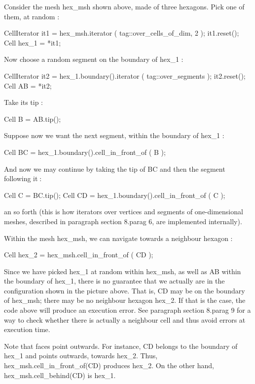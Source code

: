 Consider the mesh {\codett hex\_msh} shown above, made of three hexagons.
Pick one of them, at random :

\verbatim
   CellIterator it1 = hex_msh.iterator ( tag::over_cells_of_dim, 2 );
   it1.reset();
   Cell hex_1 = *it1;
\endverbatim

Now choose a random segment on the boundary of {\codett hex\_1} :

\verbatim
   CellIterator it2 = hex_1.boundary().iterator ( tag::over_segments );
   it2.reset();
   Cell AB = *it2;
\endverbatim

Take its tip :

\verbatim
   Cell B = AB.tip();
\endverbatim

Suppose now we want the next segment, within the boundary of {\codett hex\_1} :

\verbatim
   Cell BC = hex_1.boundary().cell_in_front_of ( B );
\endverbatim

And now we may continue by taking the tip of {\codett BC} and then the segment
following it$\;$:

\verbatim
   Cell C = BC.tip();
   Cell CD = hex_1.boundary().cell_in_front_of ( C );
\endverbatim

\noindent an so forth (this is how iterators over vertices and segments of
one-dimensional meshes, described in paragraph \numb section 8.\numb parag 6,
are implemented internally).

Within the mesh {\codett hex\_msh}, we can navigate towards a neighbour hexagon :

\verbatim
   Cell hex_2 = hex_msh.cell_in_front_of ( CD );
\endverbatim

Since we have picked {\codett hex\_1} at random within {\codett hex\_msh},
as well as {\codett AB} within the boundary of {\codett hex\_1},
there is no guarantee that we actually are in the configuration shown in the
picture above.
That is, {\codett CD} may be on the boundary of {\codett hex\_msh};
there may be no neighbour hexagon {\codett hex\_2}.
If that is the case, the code above will produce an execution error.
See paragraph \numb section 8.\numb parag 9 for a way to check whether there is actually
a neighbour cell and thus avoid errors at execution time.

Note that faces point outwards.
For instance, {\codett CD} belongs to the boundary of {\codett hex\_1} and points
outwards, towards {\codett hex\_2}.
Thus, {\codett hex\_msh.cell\_in\_front\_of(CD)} produces {\codett hex\_2}.
On the other hand, {\codett hex\_msh.cell\_behind(CD)} is {\codett hex\_1}.

